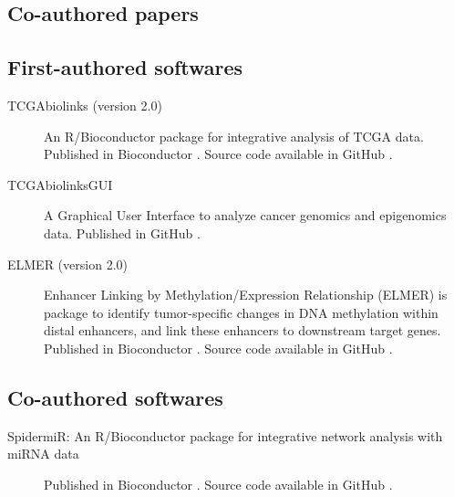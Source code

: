 \subsection{Co-authored papers}



\subsection{First-authored softwares}
\begin{description}
	\item[TCGAbiolinks (version 2.0)] An R/Bioconductor package for integrative analysis of TCGA data. Published in Bioconductor . Source code available in GitHub .
    \item[TCGAbiolinksGUI] A Graphical User Interface to analyze cancer genomics and epigenomics data. Published in GitHub .
    \item[ELMER (version 2.0)] Enhancer Linking by Methylation/Expression Relationship (ELMER) is package to identify tumor-specific changes in DNA methylation within distal enhancers, and link these enhancers to downstream target genes. Published in Bioconductor . Source code available in GitHub  .
\end{description}

\subsection{Co-authored softwares}
\begin{description}
	\item[SpidermiR: An R/Bioconductor package for integrative network analysis with miRNA data]{Published in Bioconductor . Source code available in GitHub }.
\end{description}


